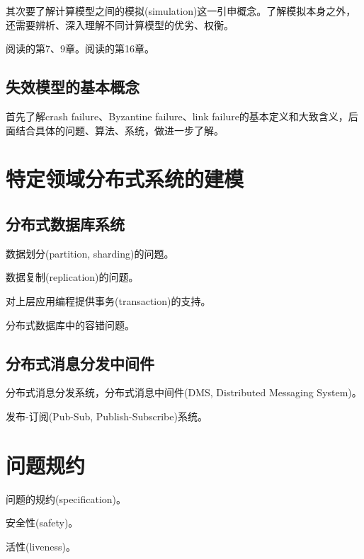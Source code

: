 其次要了解计算模型之间的模拟(simulation)这一引申概念。了解模拟本身之外，还需要辨析、深入理解不同计算模型的优劣、权衡。

\myleaf 阅读\cite{Attiya04}的第7、9章。阅读\cite{Aspnes19}的第16章。

\subsection{失效模型的基本概念}

首先了解crash failure、Byzantine failure、link failure的基本定义和大致含义，后面结合具体的问题、算法、系统，做进一步了解。


\section{特定领域分布式系统的建模}

\subsection{分布式数据库系统}

数据划分(partition, sharding)的问题。

数据复制(replication)的问题。

对上层应用编程提供事务(transaction)的支持。

分布式数据库中的容错问题。


\subsection{分布式消息分发中间件}

分布式消息分发系统，分布式消息中间件(DMS, Distributed Messaging System)。

发布-订阅(Pub-Sub, Publish-Subscribe)系统。




\section{问题规约}

问题的规约(specification)。

安全性(safety)。

活性(liveness)。

